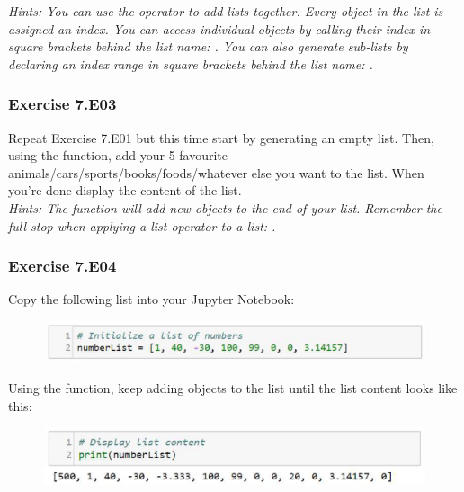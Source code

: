 \textit{Hints:
You can use the {\code{+}} operator to add lists together. Every object in the list is assigned an index. You can access individual objects by calling their index in square brackets behind the list name: {}. You can also generate sub-lists by declaring an index range in square brackets behind the list name: {}.}\\[1cm]




\subsubsection*{Exercise 7.E03}
Repeat Exercise 7.E01 but this time start by generating an empty list. Then, using the
{} function, add your 5 favourite animals/cars/sports/books/foods/whatever else
you want to the list. When you’re done display the content of the list.\\


\textit{Hints:
The {} function will add new objects to the end of your list. Remember the full stop when applying a list operator to a list: {}.}\\[1cm]




\subsubsection*{Exercise 7.E04}
Copy the following list into your Jupyter Notebook:
\begin{figure}[H]
		\centering
		\includegraphics[width=\textwidth]{../IMG/7E04_1.png} 
\end{figure}
Using the {} function, keep adding objects to the list until the list content looks like this:
\begin{figure}[H]
		\centering
		\includegraphics[width=\textwidth]{../IMG/7E04_2.png} 
\end{figure}

